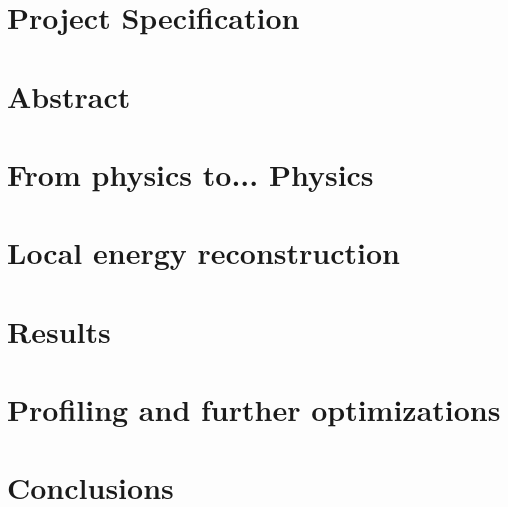 \documentclass[a4paper,10pt,twoside]{report}
\author{\me}
\begin{document}




\normalsize

\newpage

\chapter*{\textcolor{OpenlabDarkBlue}{Project Specification} }\label{chapter:specification}


\chapter*{\textcolor{OpenlabDarkBlue}{Abstract}} \label{chapter:abstract}


\begingroup
\color{OpenlabDarkBlue}
\tableofcontents
\endgroup

\listoffigures

\listoftables



\clearpage

\setcounter{page}{10}
\chapter{From physics to... Physics}\label{chapter:01}


\chapter{Local energy reconstruction}\label{chapter:02}

\chapter{Results}\label{chapter:03}

\chapter{Profiling and further optimizations}\label{chapter:04}


\chapter{Conclusions}\label{chapter:conclusions}


%



\clearpage %

% 
\end{document}
